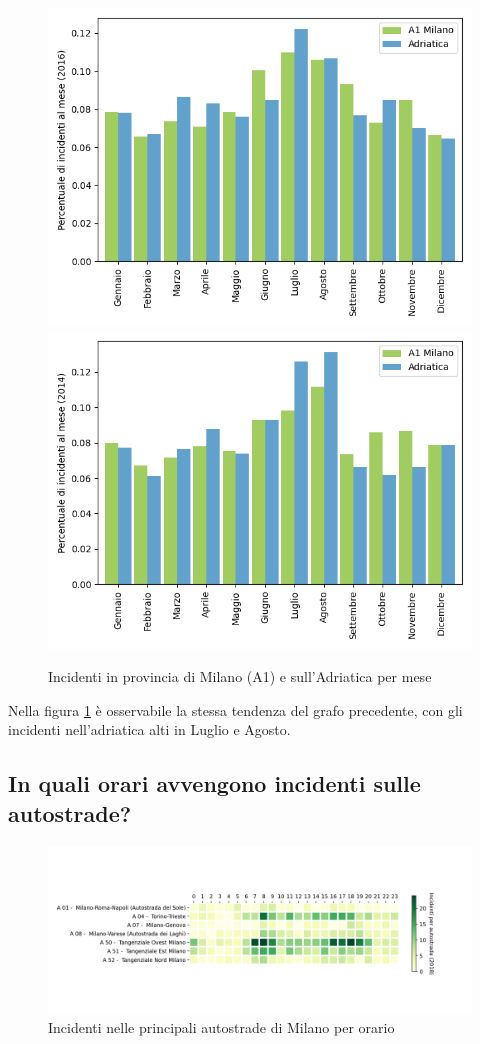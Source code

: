 \documentclass[a4paper]{report}
\begin{document}
\begin{figure}
    \includegraphics[width=0.5\linewidth]{../src/incidenti/incidenti_aci/autostrade/milano_adriatica_2016.png}
    \includegraphics[width=0.5\linewidth]{../src/incidenti/incidenti_aci/autostrade/milano_adriatica_2014.png}
    \caption{Incidenti in provincia di Milano (A1) e sull'Adriatica per mese}
    \label{fig:milano-adriatica_tendenza}
\end{figure}

Nella figura \ref{fig:milano-adriatica_tendenza} è osservabile la stessa tendenza del grafo precedente, 
con gli incidenti nell'adriatica alti in Luglio e Agosto. 

\subsection{In quali orari avvengono incidenti sulle autostrade?}

\begin{figure}
    \includegraphics[width=\linewidth]{../src/incidenti/incidenti_aci/autostrade/tangenziali_autostrade.png}
    \caption{Incidenti nelle principali autostrade di Milano per orario}
    \label{fig:tangenziali-autostrade}
\end{figure}
\end{document}

